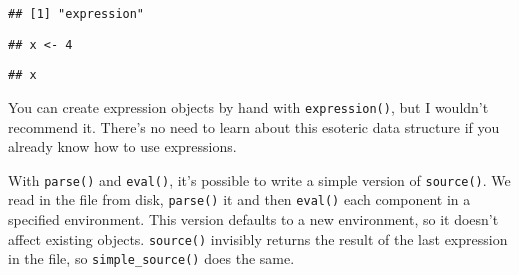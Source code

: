 \begin{Shaded}
\begin{Highlighting}[]
\end{Highlighting}
\end{Shaded}

\begin{verbatim}
## [1] "expression"
\end{verbatim}

\begin{Shaded}
\begin{Highlighting}[]
\NormalTok{exp[[}\NormalTok{]]}
\end{Highlighting}
\end{Shaded}

\begin{verbatim}
## x <- 4
\end{verbatim}

\begin{Shaded}
\begin{Highlighting}[]
\NormalTok{exp[[}\NormalTok{]]}
\end{Highlighting}
\end{Shaded}

\begin{verbatim}
## x
\end{verbatim}

You can create expression objects by hand with \texttt{expression()},
but I wouldn't recommend it. There's no need to learn about this
esoteric data structure if you already know how to use expressions.

With \texttt{parse()} and \texttt{eval()}, it's possible to write a
simple version of \texttt{source()}. We read in the file from disk,
\texttt{parse()} it and then \texttt{eval()} each component in a
specified environment. This version defaults to a new environment, so it
doesn't affect existing objects. \texttt{source()} invisibly returns the
result of the last expression in the file, so \texttt{simple\_source()}
does the same. 

